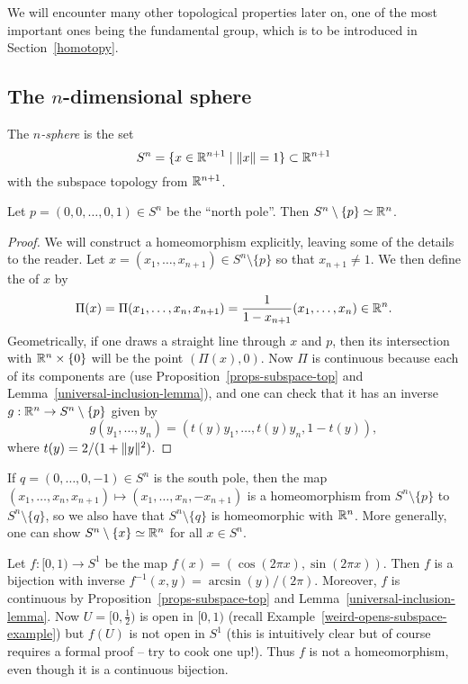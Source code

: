 We will encounter many other topological properties later on, one of the most important ones being the fundamental group, which is to be introduced in Section~\ref{homotopy}.

\subsection{The $n$-dimensional sphere}
\begin{defn}
  The \emph{$n$-sphere} is the set
  \[
    S^n = \{ x \in \mathbb{R}^{n+1} \mid \lVert x \rVert = 1 \} \subset \mathbb{R}^{n+1}
  \]
  with the subspace topology from $\mathbb{R}^{n+1}$.
\end{defn}
\begin{prop}
  Let $p = (0,0,\dots,0,1) \in S^n$ be the ``north pole''. Then $S^n \setminus \{p\} \simeq \mathbb{R}^n$.
\end{prop}
\begin{proof}
  We will construct a homeomorphism explicitly, leaving some of the details to the reader. Let $x = (x_1, \dots, x_{n+1}) \in S^n \setminus \{ p \}$ so that $x_{n+1} \not= 1$. We then define the  of $x$ by
  \[
    \Pi(x) = \Pi(x_1,\dots,x_n,x_{n+1}) = \frac{1}{1-x_{n+1}} (x_1, \dots, x_n) \in \mathbb{R}^n.
  \]
  Geometrically, if one draws a straight line through $x$ and $p$, then its intersection with $\mathbb{R}^n \times \{0 \}$ will be the point $(\Pi(x),0)$. Now $\Pi$ is continuous because each of its components are (use Proposition~\ref{props-subspace-top} and Lemma~\ref{universal-inclusion-lemma}), and one can check that it has an inverse $g : \mathbb{R}^n \to S^n \setminus \{p \}$ given by
  \[
    g(y_1, \dots, y_n) = (t(y) y_1, \dots, t(y)y_n, 1-t(y)),
  \]
  where $t(y) = 2/(1+\lVert y \rVert^2)$.
\end{proof}
\begin{rem}
  If $q = (0,\dots,0,-1) \in S^n$ is the south pole, then the map $(x_1, \dots, x_n,x_{n+1}) \mapsto (x_1,\dots,x_n,-x_{n+1})$ is a homeomorphism from $S^n \setminus \{p\}$ to $S^n \setminus \{ q \}$, so we also have that $S^n \setminus \{ q \}$ is homeomorphic with $\mathbb{R}^n$. More generally, one can show $S^n \setminus \{x\} \simeq \mathbb{R}^n$ for all $x \in S^n$.
\end{rem}
\begin{example}
  Let $f : [0,1) \to S^1$ be the map $f(x) = (\cos (2\pi x), \sin(2\pi x))$. Then $f$ is a bijection with inverse $f^{-1}(x,y) = \arcsin(y)/(2\pi)$. Moreover, $f$ is continuous by Proposition~\ref{props-subspace-top} and Lemma~\ref{universal-inclusion-lemma}. Now $U = [0,\tfrac{1}{2})$ is open in $[0,1)$ (recall Example~\ref{weird-opens-subspace-example}) but $f(U)$ is not open in $S^1$ (this is intuitively clear but of course requires a formal proof -- try to cook one up!). Thus $f$ is not a homeomorphism, even though it is a continuous bijection.
\end{example}

